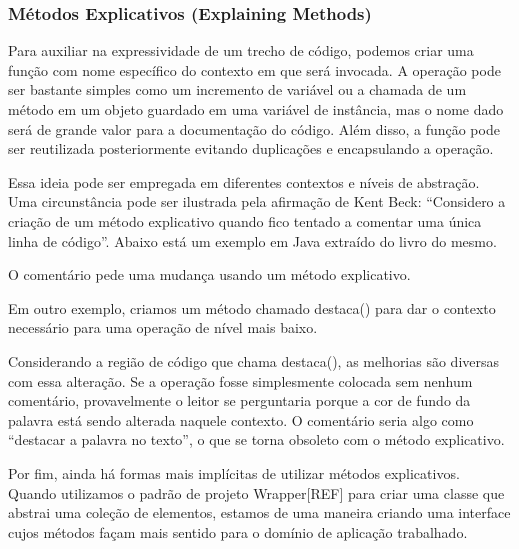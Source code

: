 \subsubsection{Métodos Explicativos (Explaining Methods)}
Para auxiliar na expressividade de um trecho de código, podemos criar uma função com nome específico do contexto em que será invocada. A operação pode ser bastante simples como um incremento de variável ou a chamada de um método em um objeto guardado em uma variável de instância, mas o nome dado será de grande valor para a documentação do código. Além disso, a função pode ser reutilizada posteriormente evitando duplicações e encapsulando a operação.
	
Essa ideia pode ser empregada em diferentes contextos e níveis de abstração. Uma circunstância pode ser ilustrada pela afirmação de Kent Beck: “Considero a criação de um método explicativo quando fico tentado a comentar uma única linha de código”. Abaixo está um exemplo em Java extraído do livro do mesmo.



O comentário pede uma mudança usando um método explicativo.
	


Em outro exemplo, criamos um método chamado destaca() para dar o contexto necessário para uma operação de nível mais baixo. 



Considerando a região de código que chama destaca(), as melhorias são diversas com essa alteração. Se a operação fosse simplesmente colocada sem nenhum comentário, provavelmente o leitor se perguntaria porque a cor de fundo da palavra está sendo alterada naquele contexto. O comentário seria algo como “destacar a palavra no texto”, o que se torna obsoleto com o método explicativo. 

Por fim, ainda há formas mais implícitas de utilizar métodos explicativos. Quando utilizamos o padrão de projeto Wrapper[REF] para criar uma classe que abstrai uma coleção de elementos, estamos de uma maneira criando uma interface cujos métodos façam mais sentido para o domínio de aplicação trabalhado.

